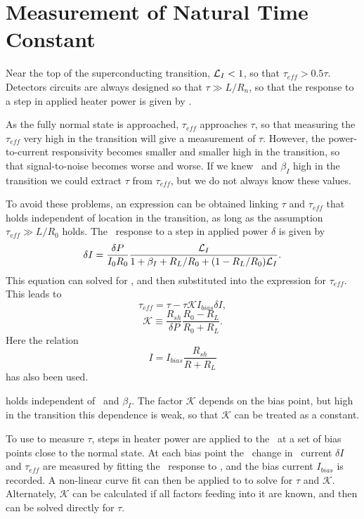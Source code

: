\section{Measurement of Natural Time Constant}\label{sec:tau-nat-theory}

Near the top of the superconducting transition, $\mathcal{L}_I < 1$, so that $\tau_{eff} > 0.5 \tau$.
Detectors circuits are always designed so that $\tau \gg L/R_n$, so that the response to a step in applied heater power is given by .

As the fully normal state is approached, $\tau_{eff}$ approaches $\tau$, so that measuring the $\tau_{eff}$ very high in the transition will give a measurement of $\tau$.
However, the power-to-current  responsivity becomes smaller and smaller high in the transition, so that signal-to-noise becomes worse and worse.
If we knew \Loop\ and $\beta_I$ high in the transition we could extract $\tau$ from $\tau_{eff}$, but we do not always know these values.

To avoid these problems, an expression can be obtained linking $\tau$ and $\tau_{eff}$ that holds independent of location in the transition, as long as the assumption $\tau_{eff} \gg L/R_0$ holds.
The \DC\ response to a step in applied power $\delta $ is given by
\begin{equation}
\delta I = \frac{\delta P}{I_0 R_0}\frac{\mathcal{L}_I}{1 + \beta_I + R_L/R_0 + (1 - R_L / R_0)\mathcal{L}_I}.
\end{equation}
This equation can solved for \Loop, and then substituted into the expression for $\tau_{eff}$.
This leads to
\begin{equation}\label{eqn:teff-from-tau}
\tau_{eff} = \tau - \tau \mathcal{K} I_{bias} \delta I,
\end{equation}
\begin{equation}
\mathcal{K} \equiv \frac{R_{sh}}{\delta P} \frac{R_0 - R_L}{R_0 + R_L}.
\end{equation}
Here the relation
\begin{equation}
I = I_{bias}\frac{R_{sh}}{R + R_L}
\end{equation}
has also been used.

 holds independent of \Loop\ and $\beta_I$.
The factor $\mathcal{K}$ depends on the bias point, but high in the transition this dependence is weak, so that $\mathcal{K}$ can be treated as a constant.

To use  to measure $\tau$, steps in heater power are applied to the \TES\ at a set of bias points close to the normal state.
At each bias point the \DC\ change in \TES\ current $\delta I$ and $\tau_{eff}$ are measured by fitting the \TES\ response to , and the bias current $I_{bias}$ is recorded.
A non-linear curve fit can then be applied to  to solve for $\tau$ and $\mathcal{K}$.
Alternately, $\mathcal{K}$ can be calculated if all factors feeding into it are known, and then  can be solved directly for $\tau$.

